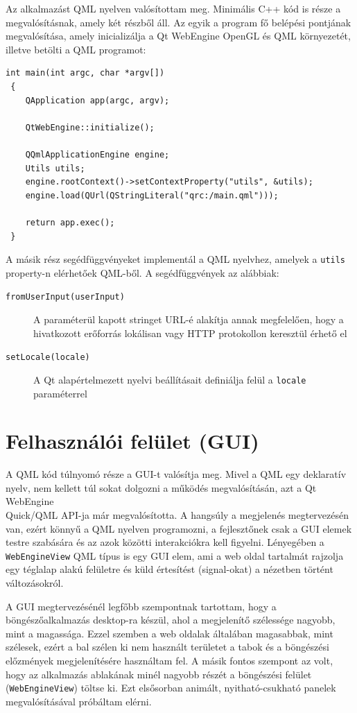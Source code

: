 \documentclass[12pt]{report}
\begin{document}
Az alkalmazást QML nyelven valósítottam meg. Minimális C++ kód is része a megvalósításnak,
amely két részből áll. Az egyik a program fő belépési pontjának megvalósítása, amely
inicializálja a Qt WebEngine OpenGL és QML környezetét, illetve betölti a QML programot:
\begin{lstlisting}[title=main.cpp]
 int main(int argc, char *argv[])
 {
    QApplication app(argc, argv);

    QtWebEngine::initialize();

    QQmlApplicationEngine engine;
    Utils utils;
    engine.rootContext()->setContextProperty("utils", &utils);
    engine.load(QUrl(QStringLiteral("qrc:/main.qml")));

    return app.exec();
 }
\end{lstlisting}
A másik rész segédfüggvényeket implementál a QML nyelvhez, amelyek a \texttt{utils} \\
property-n elérhetőek QML-ből. A segédfüggvények az alábbiak:
\begin{description}
    \item[\texttt{fromUserInput(userInput)}] A paraméterül kapott stringet URL-é alakítja
        annak megfelelően, hogy a hivatkozott erőforrás lokálisan vagy HTTP protokollon
        keresztül érhető el
    \item[\texttt{setLocale(locale)}] A Qt alapértelmezett nyelvi beállításait definiálja
        felül a \texttt{locale} paraméterrel
\end{description}

\section{Felhasználói felület (GUI)}

A QML kód túlnyomó része a GUI-t valósítja meg. Mivel a QML egy deklaratív nyelv,
nem kellett túl sokat dolgozni a működés megvalósításán, azt a Qt WebEngine \\
Quick/QML API-ja már megvalósította. A hangsúly a megjelenés megtervezésén van,
ezért könnyű a QML nyelven programozni, a fejlesztőnek csak a GUI elemek testre szabására
és az azok közötti interakciókra kell figyelni. Lényegében a \texttt{WebEngineView} QML
típus is egy GUI elem, ami a web oldal tartalmát rajzolja egy téglalap alakú felületre és
küld értesítést (signal-okat) a nézetben történt változásokról.

A GUI megtervezésénél legfőbb szempontnak tartottam, hogy a böngészőalkalmazás desktop-ra
készül, ahol a megjelenítő szélessége nagyobb, mint a magassága. Ezzel szemben a web oldalak
általában magasabbak, mint szélesek, ezért a bal szélen ki nem használt területet a tabok
és a böngészési előzmények megjelenítésére használtam fel. A másik fontos szempont az volt,
hogy az alkalmazás ablakának minél nagyobb részét a böngészési felület
(\texttt{WebEngineView}) töltse ki. Ezt elsősorban animált, nyitható-csukható panelek
megvalósításával próbáltam elérni.
\end{document}
